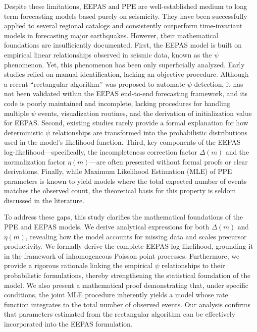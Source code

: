 \documentclass[linenum,doublespace,onecolumn]{SSA-SRL}
\theoremstyle{lemma}
\begin{document}
Despite these limitations, EEPAS and PPE are well-established medium to long term forecasting models based purely on seismicity. They have been successfully applied to several regional catalogs and consistently outperform time-invariant models in forecasting major earthquakes. However, their mathematical foundations are insufficiently documented. First, the EEPAS model is built on empirical linear relationships observed in seismic data, known as the $\psi$ phenomenon. Yet, this phenomenon has been only superficially analyzed. Early studies relied on manual identification, lacking an objective procedure. Although a recent “rectangular algorithm” was proposed to automate $\psi$ detection, it has not been validated within the EEPAS end-to-end forecasting framework, and its code is poorly maintained and incomplete, lacking procedures for handling multiple $\psi$ events, visualization routines, and the derivation of initialization value for EEPAS. Second, existing studies rarely provide a formal explanation for how deterministic $\psi$ relationships are transformed into the probabilistic distributions used in the model’s likelihood function. Third, key components of the EEPAS log-likelihood—specifically, the incompleteness correction factor $\Delta(m)$ and the normalization factor $\eta(m)$—are often presented without formal proofs or clear derivations. Finally, while Maximum Likelihood Estimation (MLE) of PPE parameters is known to yield models where the total expected number of events matches the observed count, the theoretical basis for this property is seldom discussed in the literature.

To address these gaps, this study clarifies the mathematical foundations of the PPE and EEPAS models. We derive analytical expressions for both $\Delta(m)$ and $\eta(m)$, revealing how the model accounts for missing data and scales precursor productivity. We formally derive the complete EEPAS log-likelihood, grounding it in the framework of inhomogeneous Poisson point processes. Furthermore, we provide a rigorous rationale linking the empirical $\psi$ relationships to their probabilistic formulations, thereby strengthening the statistical foundation of the model. We also present a mathematical proof demonstrating that, under specific conditions, the joint MLE procedure inherently yields a model whose rate function integrates to the total number of observed events. Our analysis confirms that parameters estimated from the rectangular algorithm can be effectively incorporated into the EEPAS formulation.
\end{document}
